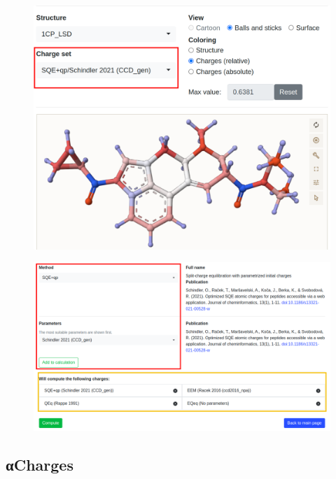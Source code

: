 \documentclass[
]{beamer}
\begin{document}
\begin{frame}
  \begin{figure}
    \includegraphics[width=1\textwidth,height=\textheight,keepaspectratio]{images/acc2.png}
  \end{figure}
\end{frame}

\begin{frame}
  \begin{figure}
    \includegraphics[width=1\textwidth,height=\textheight,keepaspectratio]{images/new_setup.png}
  \end{figure}
\end{frame}

\subsection[αCharges]{αCharges}
\end{document}
